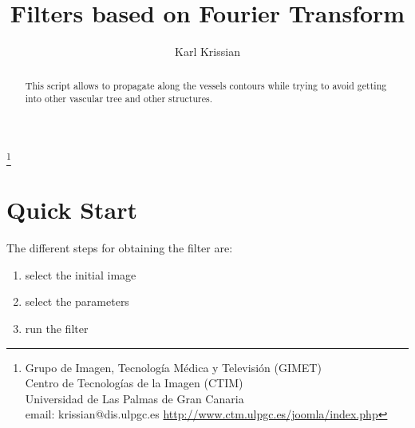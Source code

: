 \documentclass{article}
\begin{document}
\title{Filters based on Fourier Transform}
\author{ Karl Krissian
}
\thanks{
Grupo de Imagen, Tecnolog\'ia M\'edica y Televisi\'on (GIMET)\\
Centro de Tecnolog\'ias de la Imagen (CTIM)\\
Universidad de Las Palmas de Gran Canaria\\
email: krissian@dis.ulpgc.es
\url{http://www.ctm.ulpgc.es/joomla/index.php}
}


\maketitle

\begin{abstract}
This script allows to propagate along the vessels contours while trying to avoid getting into other vascular tree and other structures.
\end{abstract}


\section{Quick Start}

The different steps for obtaining the filter are:
\begin{enumerate}
  \item select the initial image
  \item select the parameters
  \item run the filter
\end{enumerate}
\end{document}
